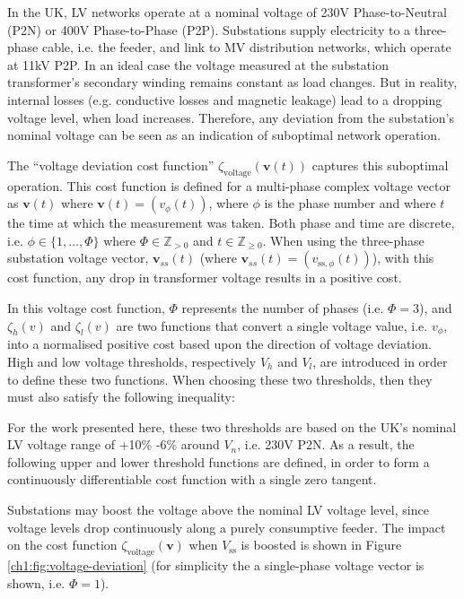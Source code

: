 In the UK, LV networks operate at a nominal voltage of 230V Phase-to-Neutral (P2N) or 400V Phase-to-Phase (P2P).
Substations supply electricity to a three-phase cable, i.e. the feeder, and  link to MV distribution networks, which operate at 11kV P2P.
In an ideal case the voltage measured at the substation transformer's secondary winding remains constant as load changes.
But in reality, internal losses (e.g. conductive losses and magnetic leakage) lead to a dropping voltage level, when load increases.
Therefore, any deviation from the substation's nominal voltage can be seen as an indication of suboptimal network operation.

The ``voltage deviation cost function'' $\zeta_\text{voltage}(\textbf{v}(t))$ captures this suboptimal operation.
This cost function is defined for a multi-phase complex voltage vector as $\textbf{v}(t)$ where $\textbf{v}(t) = (v_\phi(t))$, where $\phi$ is the phase number and where $t$ the time at which the measurement was taken.
Both phase and time are discrete, i.e. $\phi \in \{1,\dots,\Phi\}$ where $\Phi \in \mathbb{Z}_{>0}$ and $t \in \mathbb{Z}_{\geq0}$.
When using the three-phase substation voltage vector, $\textbf{v}_{ss}(t)$ (where $\textbf{v}_{ss}(t) = (v_{\text{ss},\phi}(t))$), with this cost function, any drop in transformer voltage results in a positive cost.



In this voltage cost function, $\Phi$ represents the number of phases (i.e. $\Phi = 3$), and $\zeta_h(v)$ and $\zeta_l(v)$ are two functions that convert a single voltage value, i.e. $v_\phi$, into a normalised positive cost based upon the direction of voltage deviation.
High and low voltage thresholds, respectively $V_h$ and $V_l$, are introduced in order to define these two functions.
When choosing these two thresholds, then they must also satisfy the following inequality:



For the work presented here, these two thresholds are based on the UK's nominal LV voltage range of +10\% -6\% around $V_n$, i.e. 230V P2N.
As a result, the following upper and lower threshold functions are defined, in order to form a continuously differentiable cost function with a single zero tangent.



Substations may boost the voltage above the nominal LV voltage level, since voltage levels drop continuously along a purely consumptive feeder.
The impact on the cost function $\zeta_\text{voltage}(\textbf{v})$ when $V_\text{ss}$ is boosted is shown in Figure \ref{ch1:fig:voltage-deviation} (for simplicity the a single-phase voltage vector is shown, i.e. $\Phi = 1$).

